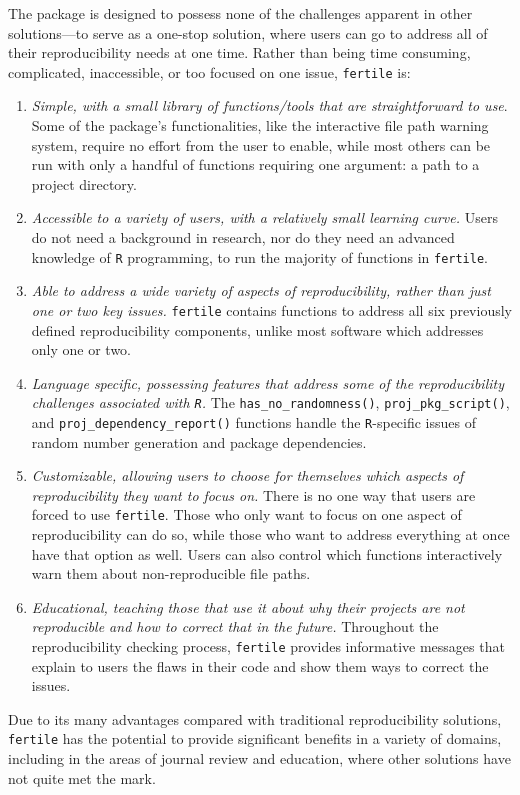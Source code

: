 \documentclass[12pt,twoside]{reedthesis}
\begin{document}
The package is designed to possess none of the challenges apparent in other solutions---to serve as a one-stop solution, where users can go to address all of their reproducibility needs at one time. Rather than being time consuming, complicated, inaccessible, or too focused on one issue, \texttt{fertile} is:
\begin{enumerate}
\def\labelenumi{\arabic{enumi})}
\item
  \emph{Simple, with a small library of functions/tools that are straightforward to use}. Some of the package's functionalities, like the interactive file path warning system, require no effort from the user to enable, while most others can be run with only a handful of functions requiring one argument: a path to a project directory.
\item
  \emph{Accessible to a variety of users, with a relatively small learning curve.} Users do not need a background in research, nor do they need an advanced knowledge of \texttt{R} programming, to run the majority of functions in \texttt{fertile}.
\item
  \emph{Able to address a wide variety of aspects of reproducibility, rather than just one or two key issues.} \texttt{fertile} contains functions to address all six previously defined reproducibility components, unlike most software which addresses only one or two.
\item
  \emph{Language specific, possessing features that address some of the reproducibility challenges associated with \texttt{R}.} The \texttt{has\_no\_randomness()}, \texttt{proj\_pkg\_script()}, and \texttt{proj\_dependency\_report()} functions handle the \texttt{R}-specific issues of random number generation and package dependencies.
\item
  \emph{Customizable, allowing users to choose for themselves which aspects of reproducibility they want to focus on.} There is no one way that users are forced to use \texttt{fertile}. Those who only want to focus on one aspect of reproducibility can do so, while those who want to address everything at once have that option as well. Users can also control which functions interactively warn them about non-reproducible file paths.
\item
  \emph{Educational, teaching those that use it about why their projects are not reproducible and how to correct that in the future.} Throughout the reproducibility checking process, \texttt{fertile} provides informative messages that explain to users the flaws in their code and show them ways to correct the issues.
\end{enumerate}
Due to its many advantages compared with traditional reproducibility solutions, \texttt{fertile} has the potential to provide significant benefits in a variety of domains, including in the areas of journal review and education, where other solutions have not quite met the mark.
\end{document}
